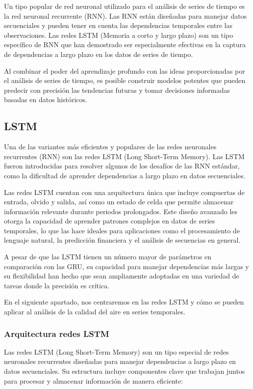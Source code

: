 \documentclass[11pt]{article}
\begin{document}
Un tipo popular de red neuronal utilizado para el análisis de series
de tiempo es la red neuronal recurrente (RNN). Las RNN están diseñadas
para manejar datos secuenciales y pueden tener en cuenta las
dependencias temporales entre las observaciones. Las redes LSTM
(Memoria a corto y largo plazo) son un tipo específico de RNN que han
demostrado ser especialmente efectivas en la captura de dependencias a
largo plazo en los datos de series de tiempo.

Al combinar el poder del aprendizaje profundo con las ideas
proporcionadas por el análisis de series de tiempo, es posible
construir modelos potentes que pueden predecir con precisión las
tendencias futuras y tomar decisiones informadas basadas en datos
históricos.


\subsection{LSTM}
\label{sec:org3b77349}
Una de las variantes más eficientes y populares de las redes
neuronales recurrentes (RNN) son las redes LSTM (Long Short-Term
Memory). Las LSTM fueron introducidas para resolver algunos de los
desafíos de las RNN estándar, como la dificultad de aprender
dependencias a largo plazo en datos secuenciales.

Las redes LSTM cuentan con una arquitectura única que incluye
compuertas de entrada, olvido y salida, así como un estado de celda
que permite almacenar información relevante durante periodos
prolongados. Este diseño avanzado les otorga la capacidad de aprender
patrones complejos en datos de series temporales, lo que las hace
ideales para aplicaciones como el procesamiento de lenguaje natural,
la predicción financiera y el análisis de secuencias en general.

A pesar de que las LSTM tienen un número mayor de parámetros en
comparación con las GRU, su capacidad para manejar dependencias más
largas y su flexibilidad han hecho que sean ampliamente adoptadas en
una variedad de tareas donde la precisión es crítica.

En el siguiente apartado, nos centraremos en las redes LSTM y cómo se
pueden aplicar al análisis de la calidad del aire en series
temporales.
\subsubsection{Arquitectura redes LSTM}
\label{sec:orgc1abb98}

Las redes LSTM (Long Short-Term Memory) son un tipo especial de redes
neuronales recurrentes diseñadas para manejar dependencias a largo
plazo en datos secuenciales. Su estructura incluye componentes clave
que trabajan juntos para procesar y almacenar información de manera
eficiente:
\end{document}
